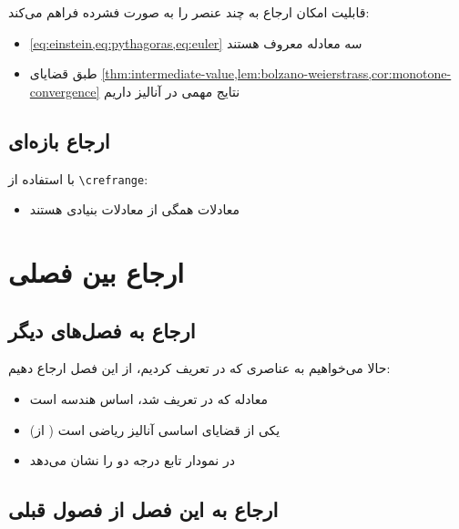 \documentclass{matinbook}
\begin{document}
قابلیت  امکان ارجاع به چند عنصر را
به صورت فشرده فراهم می‌کند:

\begin{itemize}
    \item \cref{eq:einstein,eq:pythagoras,eq:euler}
    سه معادله معروف هستند
    \item طبق قضایای \cref{thm:intermediate-value,lem:bolzano-weierstrass,cor:monotone-convergence}
    نتایج مهمی در آنالیز داریم
\end{itemize}

\section{ارجاع بازه‌ای}

با استفاده از \texttt{\textbackslash crefrange}:

\begin{itemize}
    \item معادلات 
    همگی از معادلات بنیادی هستند
\end{itemize}

\chapter{ارجاع بین فصلی}
\label{chap:cross-chapter}

\section{ارجاع به فصل‌های دیگر}

حالا می‌خواهیم به عناصری که در 
تعریف کردیم، از این فصل ارجاع دهیم:

\begin{itemize}
    \item معادله  که در
     تعریف شد، اساس هندسه است
    \item {} (از )
    یکی از قضایای اساسی آنالیز ریاضی است
    \item {} در 
    نمودار تابع درجه دو را نشان می‌دهد
\end{itemize}

\section{ارجاع به این فصل از فصول قبلی}
\end{document}
